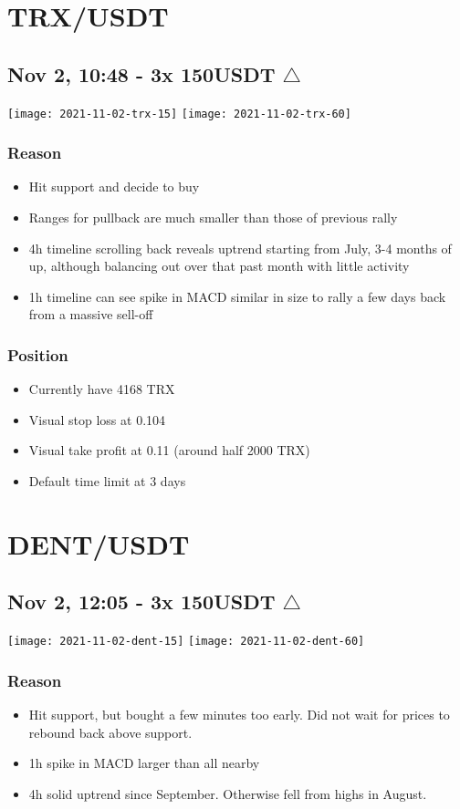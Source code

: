 \documentclass{../notes}
\begin{document}
\section{TRX/USDT}
\subsection{Nov 2, 10:48 - 3x 150USDT $\bigtriangleup$}
\texttt{[image: 2021-11-02-trx-15]}
\texttt{[image: 2021-11-02-trx-60]}

\subsubsection{Reason}
\begin{itemize}
  \item Hit support and decide to buy
  \item Ranges for pullback are much smaller than those of previous rally
  \item 4h timeline scrolling back reveals uptrend starting from July, 3-4 months of up, although balancing out over that past month with little activity
  \item 1h timeline can see spike in MACD similar in size to rally a few days back from a massive sell-off
\end{itemize}
\subsubsection{Position}
\begin{itemize}
  \item Currently have 4168 TRX
  \item Visual stop loss at 0.104
  \item Visual take profit at 0.11 (around half 2000 TRX)
  \item Default time limit at 3 days
\end{itemize}

\section{DENT/USDT}
\subsection{Nov 2, 12:05 - 3x 150USDT $\bigtriangleup$}
\texttt{[image: 2021-11-02-dent-15]}
\texttt{[image: 2021-11-02-dent-60]}
\subsubsection{Reason}
\begin{itemize}
  \item Hit support, but bought a few minutes too early. Did not wait for prices to rebound back above support.
  \item 1h spike in MACD larger than all nearby
  \item 4h solid uptrend since September. Otherwise fell from highs in August.
\end{itemize}
\end{document}
